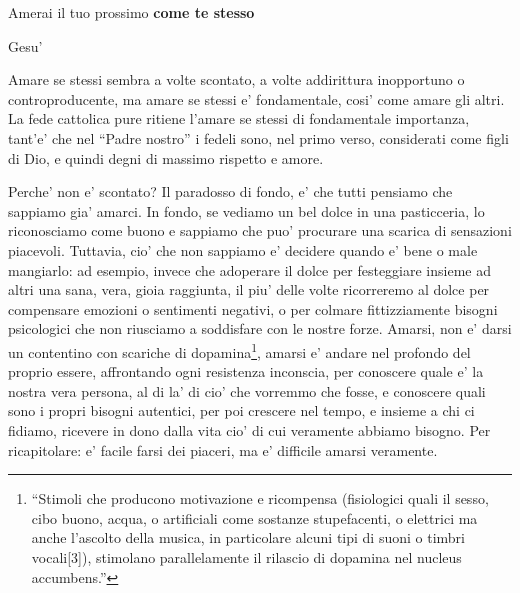 \epigraph{
    Amerai il tuo prossimo \textbf{come te stesso}
 }{Gesu'}

Amare se stessi sembra a volte scontato, a volte addirittura inopportuno o controproducente, ma amare se stessi e' fondamentale, cosi' come amare gli altri. La fede cattolica pure ritiene l'amare se stessi di fondamentale importanza, tant'e' che nel ``Padre nostro'' i fedeli sono, nel primo verso, considerati come figli di Dio, e quindi degni di massimo rispetto e amore.

Perche' non e' scontato? Il paradosso di fondo, e' che tutti pensiamo che sappiamo gia' amarci. In fondo, se vediamo un bel dolce in una pasticceria, lo riconosciamo come buono e sappiamo che puo' procurare una scarica di sensazioni piacevoli. Tuttavia, cio' che non sappiamo e' decidere quando e' bene o male mangiarlo: ad esempio, invece che adoperare il dolce per festeggiare insieme ad altri una sana, vera, gioia raggiunta, il piu' delle volte ricorreremo al dolce per compensare emozioni o sentimenti negativi, o per colmare fittizziamente bisogni psicologici che non riusciamo a soddisfare con le nostre forze. Amarsi, non e' darsi un contentino con scariche di dopamina\footnote{``Stimoli che producono motivazione e ricompensa (fisiologici quali il sesso, cibo buono, acqua, o artificiali come sostanze stupefacenti, o elettrici ma anche l'ascolto della musica, in particolare alcuni tipi di suoni o timbri vocali[3]), stimolano parallelamente il rilascio di dopamina nel nucleus accumbens.'' }, amarsi e' andare nel profondo del proprio essere, affrontando ogni resistenza inconscia, per conoscere quale e' la nostra vera persona, al di la' di cio' che vorremmo che fosse, e conoscere quali sono i propri bisogni autentici, per poi crescere nel tempo, e insieme a chi ci fidiamo, ricevere in dono dalla vita cio' di cui veramente abbiamo bisogno. Per ricapitolare: e' facile farsi dei piaceri, ma e' difficile amarsi veramente.


